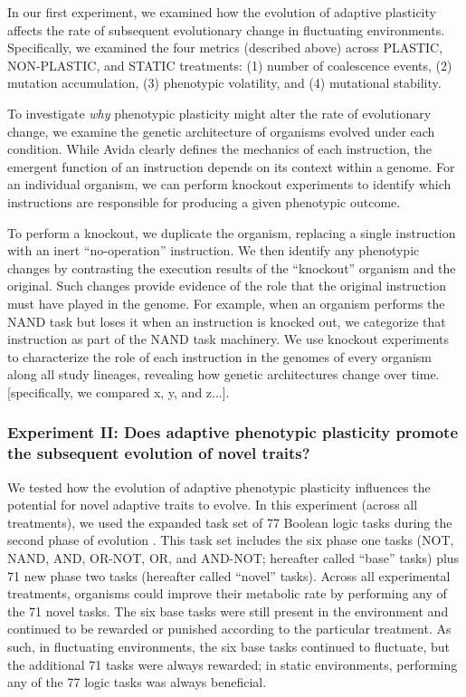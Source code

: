 In our first experiment, we examined how the evolution of adaptive plasticity affects the rate of subsequent evolutionary change in fluctuating environments.
Specifically, we examined the four metrics (described above) across PLASTIC, NON-PLASTIC, and STATIC treatments:
(1) number of coalescence events,
(2) mutation accumulation,
(3) phenotypic volatility,
and (4) mutational stability.

To investigate \textit{why} phenotypic plasticity might alter the rate of evolutionary change, we examine the genetic architecture of organisms evolved under each condition.
While Avida clearly defines the mechanics of each instruction, the emergent function of an instruction depends on its context within a genome. 
For an individual organism, we can perform knockout experiments to identify which instructions are responsible for producing a given phenotypic outcome.

To perform a knockout, we duplicate the organism, replacing a single instruction with an inert ``no-operation'' instruction.
We then identify any phenotypic changes by contrasting the execution results of the ``knockout'' organism and the original.
Such changes provide evidence of the role that the original instruction must have played in the genome.
For example, when an organism performs the NAND task but loses it when an instruction is knocked out, we categorize that instruction as part of the NAND task machinery.
We use knockout experiments to characterize the role of each instruction in the genomes of every organism along all study lineages, revealing how genetic architectures change over time.
[specifically, we compared x, y, and z...].

\vspace{0.5cm}
\subsubsection{Experiment II: Does adaptive phenotypic plasticity promote the subsequent evolution of novel traits?}
\label{sec:methods:experiment-novel-traits}

We tested how the evolution of adaptive phenotypic plasticity influences the potential for novel adaptive traits to evolve.
In this experiment (across all treatments), we used the expanded task set of 77 Boolean logic tasks during the second phase of evolution \citep{ofria_avida:_2009}.
This task set includes the six phase one tasks (NOT, NAND, AND, OR-NOT, OR, and AND-NOT; hereafter called ``base'' tasks) plus 71 new phase two tasks (hereafter called ``novel'' tasks).
Across all experimental treatments, organisms could improve their metabolic rate by performing any of the 71 novel tasks.
The six base tasks were still present in the environment and continued to be rewarded or punished according to the particular treatment.
As such, in fluctuating environments, the six base tasks continued to fluctuate, but the additional 71 tasks were always rewarded; in static environments, performing any of the 77 logic tasks was always beneficial.

